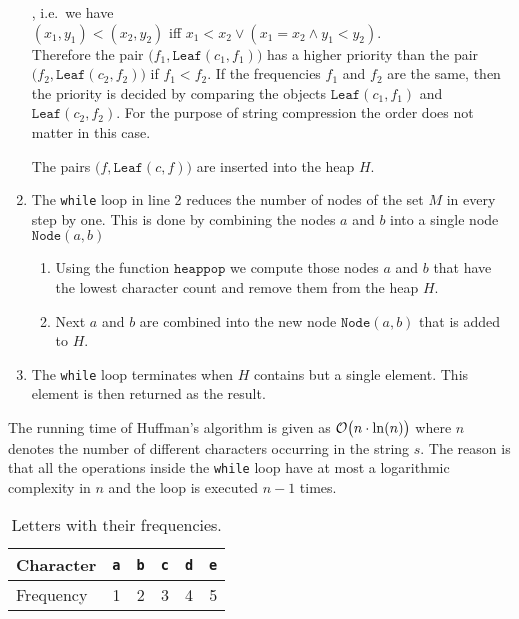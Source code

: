\begin{enumerate}
      , i.e.~we have
      \\[0.2cm]
      \hspace*{1.3cm}
      $(x_1, y_1) < (x_2, y_2)$ \quad iff \quad $x_1 < x_2 \vee (x_1 = x_2 \wedge y_1 < y_2)$.
      \\[0.2cm]
      Therefore the pair $\bigl(f_1, \texttt{Leaf}(c_1, f_1)\bigr)$ has a higher priority than the pair
      $\bigl(f_2, \texttt{Leaf}(c_2, f_2)\bigr)$ if $f_1 < f_2$.  If the frequencies $f_1$ and $f_2$ are the
      same, then the priority is decided by comparing the objects $\texttt{Leaf}(c_1, f_1)$ and
      $\texttt{Leaf}(c_2, f_2)$.  For the purpose of string compression the order does not matter in this case.

      The pairs  $\bigl(f, \texttt{Leaf}(c, f)\bigr)$ are inserted into the heap $H$.
\item The \texttt{while} loop in line 2 reduces the number of nodes of the set $M$ in every step by one.
      This is done by combining the nodes $a$ and $b$ into a single node $\texttt{Node}(a, b)$
      \begin{enumerate}
      \item Using the function $\texttt{heappop}$ we compute those nodes $a$ and $b$ that have the lowest 
            character count and remove them from the heap $H$.
      \item Next $a$ and $b$ are combined into the new node $\texttt{Node}(a,b)$ that is added to $H$.
      \end{enumerate}
\item The \texttt{while} loop terminates when $H$ contains but a single element.  This element
      is then returned as the result.
\end{enumerate}
The running time of Huffman's algorithm is given as  $\mathcal{O}\bigl(n \cdot \ln(n)\bigr)$ where $n$ denotes the
number of different characters occurring in the string $s$.  The reason is that all
the operations inside the \texttt{while} loop have at most a logarithmic complexity in $n$ and the loop is
executed $n-1$ times.
 

\begin{table}[htbp]
  \centering
\begin{tabular}[t]{|l|r|r|r|r|r|}
\hline
Character  & \texttt{a} & \texttt{b} & \texttt{c} & \texttt{d} & \texttt{e} \\
\hline
\hline
Frequency &          1 &          2 &          3 &          4 &          5 \\
\hline
\end{tabular}
  \caption{Letters with their frequencies.}
  \label{tab:frequency}
\end{table}

